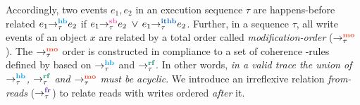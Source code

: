 Accordingly, two events $e_1,e_2$ in an execution sequence $\tau$ are happens-before 
related \ie
$\hb{\tau}{e_1}{e_2}$ if $\seqb{\tau}{e_1}{e_2}$ $\vee$ $\ithb{\tau}{e_1}{e_2}$.
%
Further, in a sequence $\tau$, all write events of an object $x$ are related by a 
total order called {\em modification-order} ($\setMO$).
%
The $\setMO$ order is constructed in compliance to a set of coherence
\lmo-rules defined by \cc \cite{C11}
based on $\setHB$ and $\setRF$. 
%
In other words, {\it in a valid \cc trace the union of $\setHB$, $\setRF$ and 
$\setMO$ must be acyclic}.
%
We introduce an irreflexive relation {\em from-reads} ($\setFR$) to relate  
reads with writes ordered {\em after} it.

